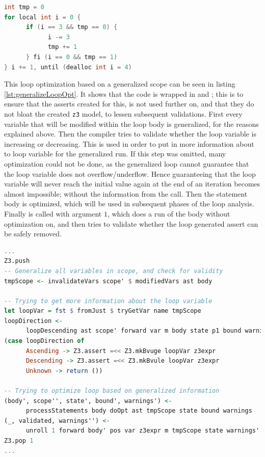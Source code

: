 \begin{lstlisting}[language=C++, label=require-generalize, caption=Loop requirering generalization]
int tmp = 0
for local int i = 0 {
      if (i == 3 && tmp == 0) {
            i -= 3
            tmp += 1
      } fi (i == 0 && tmp == 1)
} i += 1, until (dealloc int i = 4)
\end{lstlisting}
\noindent
This loop optimization based on a generalized scope can be seen in listing
\ref{lst:generalizeLoopOpt}. It shows that the code is wrapped in  and
; this is to ensure that the asserts created for this, is not used further on,
and that they do not bloat the created \texttt{z3} model, to lessen subsequent validations.
First every variable that will be modified within the loop body is generalized, for the
reasons explained above. Then the compiler tries to validate whether the loop variable is
increasing or decreasing. This is used in order to put in more information about to loop
variable for the generalized run. If this step was omitted, many optimization could not be
done, as the generalized loop cannot guarantee that the loop variable does not overflow/underflow.
Hence guaranteeing that the loop variable will never reach the initial value again at the end
of an iteration becomes almost impossible; without the information from the
 call.
Then the statement body is optimized, which will be used in subsequent phases of the loop
analysis. Finally  is called with argument $1$, which does a run of the body
without optimization on, and then tries to validate whether the loop generated assert can be
safely removed.

\begin{lstlisting}[language=Haskell, label={lst:generalizeLoopOpt},
      caption={Optimizing the loop based on generalized information.}]
...
Z3.push
-- Generalize all variables in scope, and check for validity
tmpScope <- invalidateVars scope' $ modifiedVars ast body

-- Trying to get more information about the loop variable
let loopVar = fst $ fromJust $ tryGetVar name tmpScope
loopDirection <-
      loopDescending ast scope' forward var m body state p1 bound warnings
(case loopDirection of
      Ascending -> Z3.assert =<< Z3.mkBvuge loopVar z3expr
      Descending -> Z3.assert =<< Z3.mkBvule loopVar z3expr
      Unknown -> return ())

-- Trying to optimize loop based on generalized information
(body', scope'', state', bound', warnings') <-
      processStatements body doOpt ast tmpScope state bound warnings
(_, validated, warnings'') <-
      unroll 1 forward body' pos var z3expr m tmpScope state warnings'
Z3.pop 1
...
\end{lstlisting}

